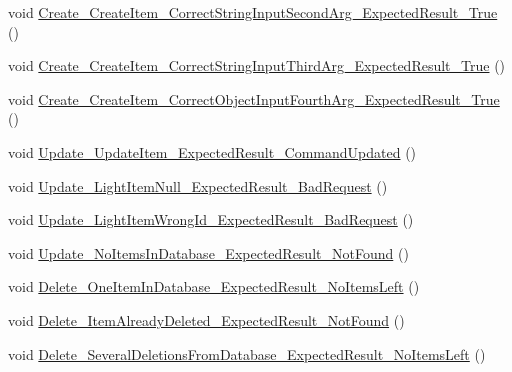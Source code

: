 \begin{DoxyCompactItemize}
\item 
void \mbox{\hyperlink{class_web_api_1_1_unit_1_1_test_1_1_u_t___light_controller_aa31408d9b9a852e0942e68219c623961}{Create\+\_\+\+Create\+Item\+\_\+\+Correct\+String\+Input\+Second\+Arg\+\_\+\+Expected\+Result\+\_\+\+True}} ()
\item 
void \mbox{\hyperlink{class_web_api_1_1_unit_1_1_test_1_1_u_t___light_controller_aea597f0275d96013128c7b16aa78c8c6}{Create\+\_\+\+Create\+Item\+\_\+\+Correct\+String\+Input\+Third\+Arg\+\_\+\+Expected\+Result\+\_\+\+True}} ()
\item 
void \mbox{\hyperlink{class_web_api_1_1_unit_1_1_test_1_1_u_t___light_controller_ae403586b534883263388b7133c006330}{Create\+\_\+\+Create\+Item\+\_\+\+Correct\+Object\+Input\+Fourth\+Arg\+\_\+\+Expected\+Result\+\_\+\+True}} ()
\item 
void \mbox{\hyperlink{class_web_api_1_1_unit_1_1_test_1_1_u_t___light_controller_ae31a1a8e676d4c230cb4dc1921751836}{Update\+\_\+\+Update\+Item\+\_\+\+Expected\+Result\+\_\+\+Command\+Updated}} ()
\item 
void \mbox{\hyperlink{class_web_api_1_1_unit_1_1_test_1_1_u_t___light_controller_a20a3cdfcc545da421282532b856f5010}{Update\+\_\+\+Light\+Item\+Null\+\_\+\+Expected\+Result\+\_\+\+Bad\+Request}} ()
\item 
void \mbox{\hyperlink{class_web_api_1_1_unit_1_1_test_1_1_u_t___light_controller_a6dce49c138e222c7456623803a0ca3ca}{Update\+\_\+\+Light\+Item\+Wrong\+Id\+\_\+\+Expected\+Result\+\_\+\+Bad\+Request}} ()
\item 
void \mbox{\hyperlink{class_web_api_1_1_unit_1_1_test_1_1_u_t___light_controller_adbcd46b199ab4c7ec05f12f125b4a456}{Update\+\_\+\+No\+Items\+In\+Database\+\_\+\+Expected\+Result\+\_\+\+Not\+Found}} ()
\item 
void \mbox{\hyperlink{class_web_api_1_1_unit_1_1_test_1_1_u_t___light_controller_a0260440a3629756ee4189cf13754aaee}{Delete\+\_\+\+One\+Item\+In\+Database\+\_\+\+Expected\+Result\+\_\+\+No\+Items\+Left}} ()
\item 
void \mbox{\hyperlink{class_web_api_1_1_unit_1_1_test_1_1_u_t___light_controller_a65f725bdee14afa8a4ab2bb987ed9872}{Delete\+\_\+\+Item\+Already\+Deleted\+\_\+\+Expected\+Result\+\_\+\+Not\+Found}} ()
\item 
void \mbox{\hyperlink{class_web_api_1_1_unit_1_1_test_1_1_u_t___light_controller_a7378557561a2073269014793cf6e72da}{Delete\+\_\+\+Several\+Deletions\+From\+Database\+\_\+\+Expected\+Result\+\_\+\+No\+Items\+Left}} ()
\end{DoxyCompactItemize}
